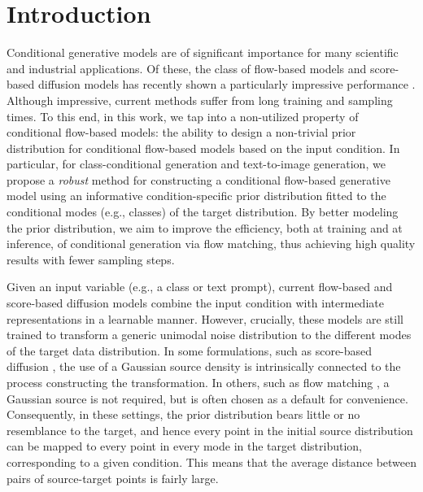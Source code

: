 \section{Introduction}

Conditional generative models are of significant importance for many scientific and industrial applications. 
Of these, the class of flow-based models and score-based diffusion models has recently shown a particularly impressive performance \citep{lipman2022flow, esser2024scaling, dhariwal2021diffusion, ho2022classifier}.  
Although impressive, current methods suffer from long training and sampling times. 
To this end, in this work, we tap into a non-utilized property of conditional flow-based models: the ability to design a non-trivial prior distribution for conditional flow-based models based on the input condition. In particular, for class-conditional generation and text-to-image generation, we propose a \emph{robust} method for constructing a conditional flow-based generative model using an informative
condition-specific prior distribution fitted to the conditional modes (e.g., classes) of the target distribution. 
By better modeling the 
prior distribution, 
we aim to improve the efficiency, both at training and at inference, of conditional generation via flow matching, thus achieving high quality results with fewer sampling steps. 



Given an input variable (e.g., a class or text prompt), current flow-based and score-based diffusion models 
combine the input condition with intermediate representations in a learnable manner. 
However, crucially, these models are still trained to transform a generic unimodal noise distribution to the different modes of the target data distribution.
In some formulations, such as score-based diffusion \citep{ho2020denoising, song2020score, sohl2015deep}, the use of a Gaussian source density is intrinsically connected to the process constructing the transformation. In others, such as flow matching \citep{lipman2022flow, liu2022flow, albergo2022building}, a Gaussian source is not required, but is often chosen as a default for convenience.
Consequently, in these settings, the prior distribution bears little or no resemblance to the target, and hence every point in the initial source distribution can be mapped to every point in every mode in the target distribution, corresponding to a given condition. This means that the average distance between pairs of source-target points is fairly large. %


